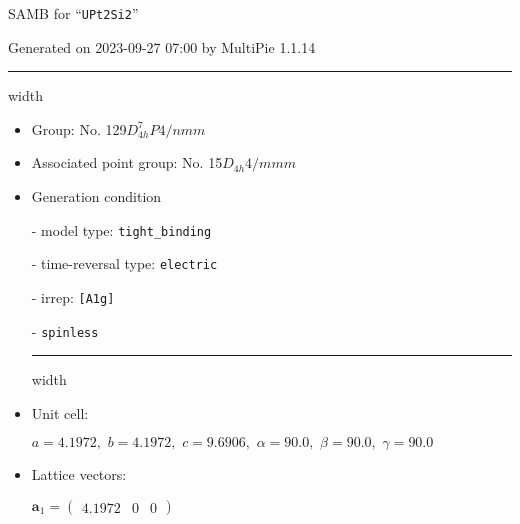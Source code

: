 \documentclass[fleqn,10pt,landscape]{article}
\begin{document}
\setcounter{MaxMatrixCols}{16}

\setlength{\baselineskip}{16pt}
\footnotesize
\begin{center}
\LARGE
SAMB for ``\texttt{UPt2Si2}''
\end{center}
\begin{flushright}
Generated on 2023-09-27 07:00 by MultiPie 1.1.14
\end{flushright}
\vspace{1cm}


 \hfil \hrule height 1mm width \textwidth \hfil

\begin{itemize}
\item Group: No. 129\quad$D_{4h}^{7}$\quad$P4/nmm$\quad[ tetragonal ]

\item Associated point group: No. 15\quad$D_{4h}$\quad$4/mmm$\quad[ tetragonal ]

\vspace{5mm}

\item Generation condition

\quad - model type: \texttt{tight_binding}

\quad - time-reversal type: \texttt{electric}

\quad - irrep: \texttt{[A1g]}

\quad - \texttt{spinless}


 \hfil \hrule height 1mm width \textwidth \hfil

\item Unit cell:

\quad $a=4.1972,\,\, b=4.1972,\,\, c=9.6906,\,\, \alpha=90.0,\,\, \beta=90.0,\,\, \gamma=90.0$

\item Lattice vectors:

\quad $\bm{a}_1=\begin{pmatrix} 4.1972 & 0 & 0 \end{pmatrix}$


\end{itemize}
\end{document}
